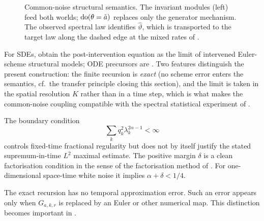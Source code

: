 
\begin{figure}[t]
\centering
\resizebox{.98\textwidth}{!}{}
\caption{Common-noise structural semantics. The invariant modules (left) feed both worlds; $\operatorname{do}(\theta=\tilde a)$ replaces only the generator mechanism. The observed spectral law identifies $\widehat\vartheta$, which is transported to the target law along the dashed edge at the mixed rates of .}
\label{fig:modules}
\end{figure}

\begin{remark}\label{rem:sde-analogue}
For SDEs, \citet{SokolHansen2014} obtain the post-intervention equation as the limit of intervened Euler-scheme structural models; ODE precursors are \citet{MooijJanzingScholkopf2013,RubensteinEtAl2018}. Two features distinguish the present construction: the finite recursion is \emph{exact} (no scheme error enters the semantics, cf.\ the transfer principle closing this section), and the limit is taken in the spatial resolution $K$ rather than in a time step, which is what makes the common-noise coupling compatible with the spectral statistical experiment of .
\end{remark}

\begin{remark}
The boundary condition
\[
 \sum_kq_k^2\lambda_k^{2\alpha-1}<\infty
\]
controls fixed-time fractional regularity but does not by itself justify the stated supremum-in-time $L^2$ maximal estimate. The positive margin $\delta$ is a clean factorisation condition in the sense of the factorisation method of \citet{DaPratoKwapienZabczyk1987}. For one-dimensional space-time white noise it implies $\alpha+\delta<1/4$.
\end{remark}

The exact recursion has no temporal approximation error. Such an error appears only when $G_{a,k,r}$ is replaced by an Euler or other numerical map. This distinction becomes important in .
